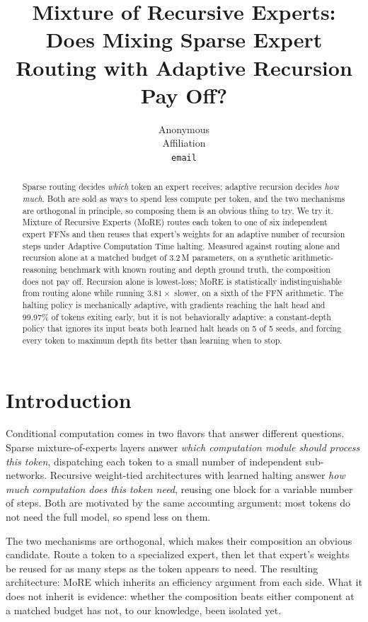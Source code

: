 \documentclass{article}
\title{Mixture of Recursive Experts: Does Mixing Sparse Expert
Routing with Adaptive Recursion Pay Off?}
\author{%
  Anonymous \\
  Affiliation \\
  \texttt{email} \\
}
\begin{document}
\maketitle

\begin{abstract}
Sparse routing decides \emph{which} token an expert receives;
adaptive recursion decides \emph{how much}. Both are sold as ways to spend
less compute per token, and the two mechanisms are orthogonal in principle,
so composing them is an obvious thing to try. We try it. Mixture of Recursive
Experts (MoRE) routes each token to one of six independent expert FFNs and
then reuses that expert's weights for an adaptive number of recursion steps
under Adaptive Computation Time halting. Measured against routing alone and
recursion alone at a matched budget of 3.2\,M parameters, on a synthetic
arithmetic-reasoning benchmark with known routing and depth ground truth, the
composition does not pay off. Recursion alone is lowest-loss; MoRE is
statistically indistinguishable from routing alone while running
$3.81\times$ slower, on a sixth of the FFN arithmetic. The halting policy is
mechanically adaptive, with gradients reaching the halt head and 99.97\% of
tokens exiting early, but it is not behaviorally adaptive: a constant-depth
policy that ignores its input beats both learned halt heads on 5 of 5 seeds,
and forcing every token to maximum depth fits better than learning when to
stop.
\end{abstract}

\section{Introduction}

Conditional computation comes in two flavors that answer different questions.
Sparse mixture-of-experts layers \citep{jacobs1991moe,shazeer2017moe,
fedus2022switch} answer \emph{which computation module should process this
token}, dispatching each token to a small number of independent
sub-networks. Recursive weight-tied architectures with learned halting
\citep{graves2016act,dehghani2019ut,banino2021pondernet} answer \emph{how much
computation does this token need}, reusing one block for a variable number of
steps. Both are motivated by the same accounting argument: most tokens do not
need the full model, so spend less on them.

The two mechanisms are orthogonal, which makes their composition an obvious
candidate. Route a token to a specialized expert, then let that expert's
weights be reused for as many steps as the token appears to need. The resulting
architecture: MoRE which inherits an efficiency argument from each side. What
it does not inherit is evidence: whether the composition beats either component
at a matched budget has not, to our knowledge, been isolated yet.
\end{document}
